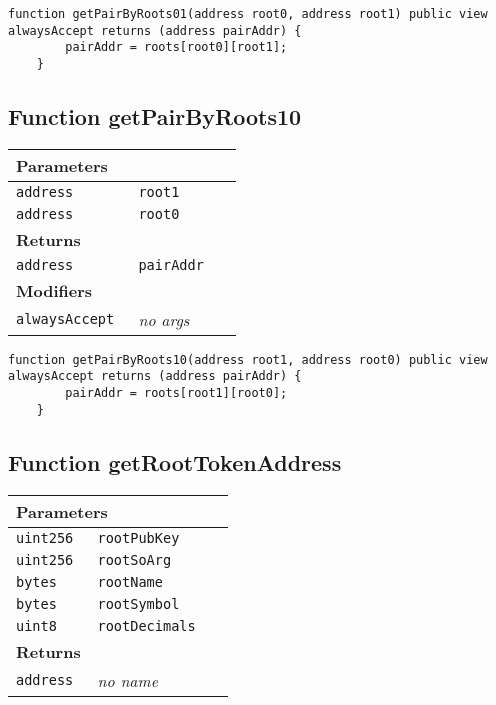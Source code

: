 \vspace{2cm}

\begin{lstlisting}[firstnumber=314]
	function getPairByRoots01(address root0, address root1) public view alwaysAccept returns (address pairAddr) {
		pairAddr = roots[root0][root1];
	}
\end{lstlisting}

\subsection{Function getPairByRoots10}


\ifsoltables
\noindent\begin{tabular}{|l|l|p{5cm}|}\hline
\multicolumn{3}{|l|}{\bf Parameters}\\\hline
\tt address & \tt root1 &\\\hline
\tt address & \tt root0 &\\\hline
\multicolumn{3}{|l|}{\bf Returns}\\\hline
\tt address & \tt pairAddr &\\\hline
\multicolumn{3}{|l|}{\bf Modifiers}\\\hline
\tt alwaysAccept & {\em no args} &\\\hline
\end{tabular}
\fi

\vspace{2cm}

\begin{lstlisting}[firstnumber=318]
	function getPairByRoots10(address root1, address root0) public view alwaysAccept returns (address pairAddr) {
		pairAddr = roots[root1][root0];
	}
\end{lstlisting}

\subsection{Function getRootTokenAddress}


\ifsoltables
\noindent\begin{tabular}{|l|l|p{5cm}|}\hline
\multicolumn{3}{|l|}{\bf Parameters}\\\hline
\tt uint256 & \tt rootPubKey &\\\hline
\tt uint256 & \tt rootSoArg &\\\hline
\tt bytes & \tt rootName &\\\hline
\tt bytes & \tt rootSymbol &\\\hline
\tt uint8 & \tt rootDecimals &\\\hline
\multicolumn{3}{|l|}{\bf Returns}\\\hline
\tt address & {\em no name} &\\\hline
\end{tabular}
\fi


